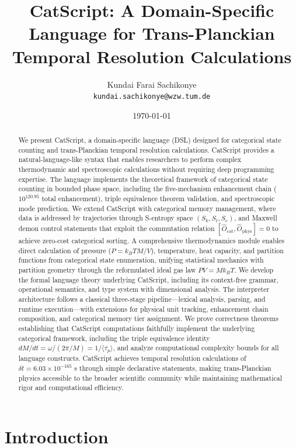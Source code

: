 \documentclass[twocolumn,10pt]{article}
\title{CatScript: A Domain-Specific Language for Trans-Planckian Temporal Resolution Calculations}
\author{
    Kundai Farai Sachikonye\\
    \texttt{kundai.sachikonye@wzw.tum.de}
}
\date{\today}
\begin{document}
\maketitle

\begin{abstract}
We present CatScript, a domain-specific language (DSL) designed for categorical state counting and trans-Planckian temporal resolution calculations. CatScript provides a natural-language-like syntax that enables researchers to perform complex thermodynamic and spectroscopic calculations without requiring deep programming expertise. The language implements the theoretical framework of categorical state counting in bounded phase space, including the five-mechanism enhancement chain ($10^{120.95}$ total enhancement), triple equivalence theorem validation, and spectroscopic mode prediction. We extend CatScript with categorical memory management, where data is addressed by trajectories through S-entropy space $(S_k, S_t, S_e)$, and Maxwell demon control statements that exploit the commutation relation $[\hat{O}_{\text{cat}}, \hat{O}_{\text{phys}}] = 0$ to achieve zero-cost categorical sorting. A comprehensive thermodynamics module enables direct calculation of pressure ($P = k_B T M/V$), temperature, heat capacity, and partition functions from categorical state enumeration, unifying statistical mechanics with partition geometry through the reformulated ideal gas law $PV = Mk_BT$. We develop the formal language theory underlying CatScript, including its context-free grammar, operational semantics, and type system with dimensional analysis. The interpreter architecture follows a classical three-stage pipeline---lexical analysis, parsing, and runtime execution---with extensions for physical unit tracking, enhancement chain composition, and categorical memory tier assignment. We prove correctness theorems establishing that CatScript computations faithfully implement the underlying categorical framework, including the triple equivalence identity $dM/dt = \omega/(2\pi/M) = 1/\langle\tau_p\rangle$, and analyze computational complexity bounds for all language constructs. CatScript achieves temporal resolution calculations of $\delta t = 6.03 \times 10^{-165}$ s through simple declarative statements, making trans-Planckian physics accessible to the broader scientific community while maintaining mathematical rigor and computational efficiency.
\end{abstract}

\section{Introduction}
\end{document}
